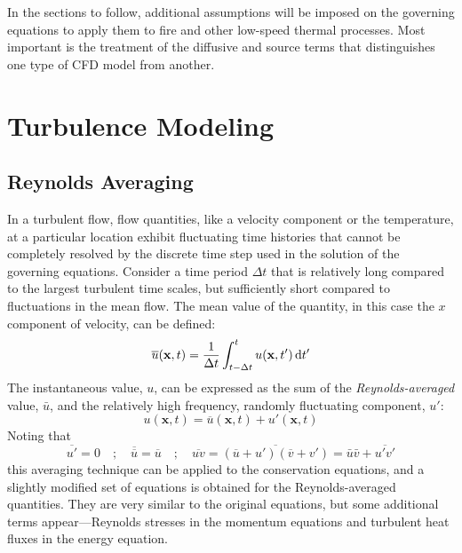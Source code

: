 \documentclass[graybox]{svmult}
\begin{document}
In the sections to follow, additional assumptions will be imposed on the governing equations to apply them to fire and other low-speed thermal processes. Most important is the treatment of the diffusive and source terms that distinguishes one type of CFD model from another.


\section{Turbulence Modeling}
\label{section:turbulence}


\subsection{Reynolds Averaging}

In a turbulent flow, flow quantities, like a velocity component or the temperature, at a particular location exhibit fluctuating time histories that cannot be completely resolved by the discrete time step used in the solution of the governing equations. Consider a time period $\Delta t$ that is relatively long compared to the largest turbulent time scales, but sufficiently short compared to fluctuations in the mean flow. The mean value of the quantity, in this case the $x$ component of velocity, can be defined:
\begin{equation}
   \overline{u}(\mathbf{x},t) = \frac{1}{\Delta t} \int_{t-\Delta t}^t  u(\mathbf{x},t') \, {\rm d}t'
\end{equation}
The instantaneous value, $u$, can be expressed as the sum of the {\em Reynolds-averaged} value, $\bar{u}$, and the relatively high frequency, randomly fluctuating component, $u'$:
\begin{equation}
   u(\mathbf{x},t) = \overline{u}(\mathbf{x},t) + u'(\mathbf{x},t)
\end{equation}
Noting that
\begin{equation}
\overline{u'}=0 \quad ; \quad \overline{\overline{u}} = \overline{u} \quad ; \quad \overline{uv} = \overline{ (\overline{u}+u')(\overline{v}+v')} = \bar{u}\bar{v} + \overline{u'v'}
\end{equation}
this averaging technique can be applied to the conservation equations, and a slightly modified set of equations is obtained for the Reynolds-averaged quantities. They are very similar to the original equations, but some additional terms appear---Reynolds stresses in the momentum equations and turbulent heat fluxes in the energy equation.
\end{document}
